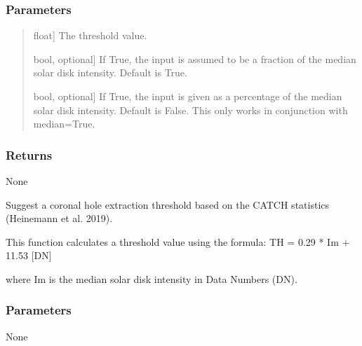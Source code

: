 \documentclass[letterpaper,10pt,english]{sphinxmanual}
\begin{document}
\begin{fulllineitems}
\begin{fulllineitems}
\subsubsection{Parameters}
\label{\detokenize{pycatch/pycatch:id31}}\begin{quote}
\begin{description}
\sphinxlineitem{threshold}{[}float{]}
\sphinxAtStartPar
The threshold value.

\sphinxlineitem{median}{[}bool, optional{]}
\sphinxAtStartPar
If True, the input is assumed to be a fraction of the median solar disk intensity. Default is True.

\sphinxlineitem{no\_percentage}{[}bool, optional{]}
\sphinxAtStartPar
If True, the input is given as a percentage of the median solar disk intensity. Default is False.
This only works in conjunction with median=True.

\end{description}
\end{quote}


\subsubsection{Returns}
\label{\detokenize{pycatch/pycatch:id32}}
\sphinxAtStartPar
None

\end{fulllineitems}


\begin{fulllineitems}
\label{\detokenize{pycatch/pycatch:pycatch.pycatch.pycatch.suggest_threshold}}
\pysigstartsignatures
{}
\pysigstopsignatures
\sphinxAtStartPar
Suggest a coronal hole extraction threshold based on the CATCH statistics (Heinemann et al. 2019).

\sphinxAtStartPar
This function calculates a threshold value using the formula:
TH = 0.29 * Im + 11.53 {[}DN{]}

\sphinxAtStartPar
where Im is the median solar disk intensity in Data Numbers (DN).


\subsubsection{Parameters}
\label{\detokenize{pycatch/pycatch:id33}}
\sphinxAtStartPar
None



\end{fulllineitems}
\end{fulllineitems}
\end{document}
